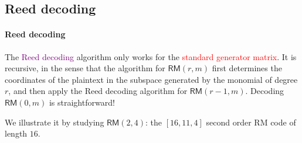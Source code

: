 \documentclass[a4paper, 11pt, openany]{book}
\numberwithin{equation}{section}
\theoremstyle{plain}
\theoremstyle{definition}
\newcommand{\Important}[1]{\textcolor{red}{#1}}
\newcommand{\Define}[1]{\textcolor{purple}{#1}}
\newcommand{\code}[1]{\mathsf{#1}}
\newcommand{\ReedMuller}            {\code{RM}}
\begin{document}
\subsection{Reed decoding}

\paragraph{Reed decoding}
The \Define{Reed decoding} algorithm only works for the \Important{standard generator matrix}. It is recursive, in the sense that the algorithm for $\ReedMuller(r,m)$ first determines the coordinates of the plaintext in the subspace generated by the monomial of degree $r$, and then apply the Reed decoding algorithm for $\ReedMuller(r-1,m)$. Decoding $\ReedMuller(0,m)$ is straightforward!

We illustrate it by studying $\ReedMuller(2,4)$: the $[16,11,4]$ second order RM code of length $16$.
\end{document}
